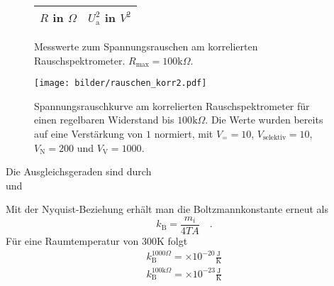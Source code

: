 	
	
	
		\begin{figure}[htbp]

	\begin{minipage}{0.3\textwidth} 

			\centering
			\begin{tabular}{cc}
				\toprule \midrule
				$R$ in $\Omega$ & $U_\text{a}^2$ in $V^2$ \\
				\midrule
							
				\midrule \bottomrule
			\end{tabular}
			\caption{Messwerte zum Spannungsrauschen am korrelierten  
			Rauschspektrometer. $R_\text{max}=100 \text{k}\Omega$.}
			\label{tab:rauschen_korr2}

	\end{minipage}

	\hfill

	\begin{minipage}{0.6\textwidth}

			\centering
			\texttt{[image: bilder/rauschen\_korr2.pdf]}
			\caption{Spannungsrauschkurve am korrelierten Rauschspektrometer für einen 
			regelbaren Widerstand bis $100\text{k}\Omega$. Die Werte wurden bereits auf eine 
			Verstärkung von 	$1$ normiert, mit $V_= =10$, $V_\text{selektiv}=10$, $V_\text{N}=200$ und 
			$V_\text{V}=1000$. }
			\label{fig:rauschen_korr2}
			
	\end{minipage}

	\end{figure}		
		

		Die Ausgleichsgeraden sind durch
		\begin{equation}
			
		\end{equation}
		und
		\begin{equation}
			
		\end{equation}
		
		Mit der Nyquist-Beziehung erhält man die Boltzmannkonstante erneut als
		\begin{equation}
		k_\text{B}=\frac{m_i}{4 T A} \quad .
		\end{equation}
 		Für eine Raumtemperatur von $300$K folgt
		\begin{align}
		k_\text{B}^{1000\Omega}			=   \times 10^{-20}\frac{\text{J}}
																			{\text{K}} \\ 
		k_\text{B}^{100\text{k}\Omega}	=   \times 10^{-23}\frac{\text{J}}
																			{\text{K}} 
		\end{align}
	
